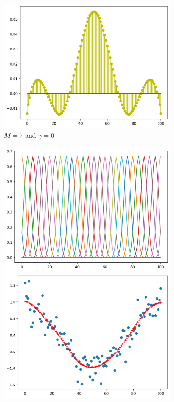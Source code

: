\documentclass[10pt,twoside]{book}
\begin{document}
\begin{figure}
\begin{subfigure}{0.32\textwidth}
     \includegraphics[width=\textwidth]{smoothing_M7_gamma0_smoothingKernel}
     \caption{$M=7$ and $\gamma=0$}
     \label{fig:smoothing_M7_gamma0}
  \end{subfigure}
  \hfill
  \begin{subfigure}{0.32\textwidth}
     \centering
     \includegraphics[width=\textwidth]{smoothing_M28_gamma1000_basisFunctions}
     \includegraphics[width=\textwidth]{smoothing_M28_gamma1000_fitted}

\end{subfigure}
\end{figure}
\end{document}
